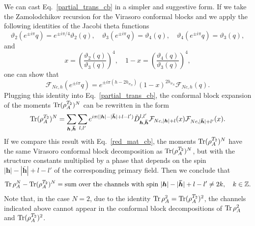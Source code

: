 \documentclass[a4paper,11pt]{article}
\def\Tr{\mathop{\mbox{\normalfont Tr}}\nolimits}
\begin{document}
We can cast Eq.~\eqref{partial_trans_cb} in a simpler and suggestive form. If we take the 
Zamolodchikov recursion for the Virasoro conformal blocks and we apply 
the following identities of the Jacobi theta functions
\begin{equation}
 \vartheta_2(e^{\pm i\pi}q)=e^{\pm i\pi/4}\vartheta_2(q), \quad 
 \vartheta_3(e^{\pm i\pi}q)=\vartheta_4(q), \quad 
 \vartheta_4(e^{\pm i\pi}q)=\vartheta_3(q),
\end{equation}
and 
\begin{equation}
 x=\left(\frac{\vartheta_2(q)}{\vartheta_3(q)}\right)^4, \quad 
 1-x=\left(\frac{\vartheta_4(q)}{\vartheta_3(q)}\right)^4,
\end{equation}
one can show that 
\begin{equation}
 \mathcal{F}_{Nc, h}(e^{\pm i\pi}q)=e^{\pm i\pi(h-2h_{\sigma_N})}
 (1-x)^{2h_{\sigma_N}}\mathcal{F}_{Nc, h}(q).
\end{equation}
Plugging this identity into Eq.~\eqref{partial_trans_cb}, the conformal block
expansion of the moments $\Tr(\rho_A^{T_2})^N$ can be rewritten
in the form
\begin{equation}\label{partial_trans_cb_2}
 \Tr(\rho_A^{T_2})^N=\sum_{\boldsymbol{h}, \boldsymbol{\bar{h}}}\sum_{l, l'} 
 e^{i\pi(|\boldsymbol{h}|-|\boldsymbol{\bar{h}}|+l-l')}\tilde{D}_{\boldsymbol{h}, \boldsymbol{\bar{h}}}^{l, l'} 
 \mathcal{F}_{Nc, |\boldsymbol{h}|+l}(x)\mathcal{F}_{Nc, |\boldsymbol{\bar{h}}|+l'}(x).
\end{equation}  
If we compare this result with Eq.~\eqref{red_mat_cb}, the moments $\Tr(\rho_A^{T_2})^N$
have the same Virasoro conformal block decomposition as $\Tr(\rho_A^{T_2})^N$, 
but with the structure constants multiplied by a phase that depends on
the spin $|\boldsymbol{h}|-|\boldsymbol{\bar{h}}|+l-l'$ of the corresponding primary field. 
Then we conclude that
\begin{equation}
 \Tr\rho_A^N-\Tr(\rho_A^{T_2})^N=\text{sum over the channels with spin}\,\,
 |\boldsymbol{h}|-|\boldsymbol{\bar{h}}|+l-l'\neq 2k,\quad k\in\mathbb{Z}.
\end{equation}
Note that, in the case $N=2$, due 
to the identity $\Tr\rho_A^2=\Tr(\rho_A^{T_2})^2$, the channels indicated above cannot appear in the 
conformal block decompositions of $\Tr\rho_A^2$ and $\Tr(\rho_A^{T_2})^2$.
\end{document}
